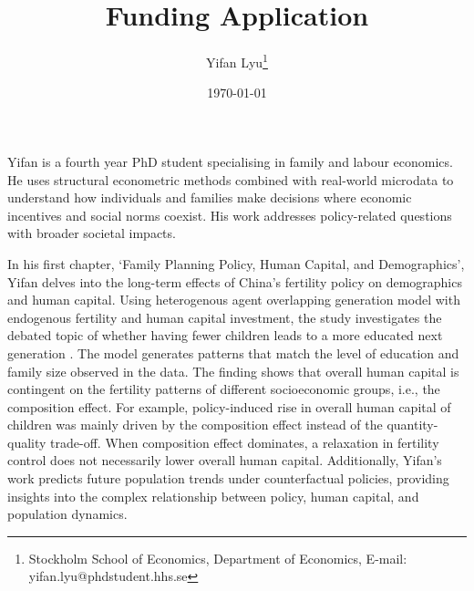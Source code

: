 \documentclass[12pt, letterpaper]{article}
\begin{document}
\providecommand{\titlename}{Funding Application}
\title{\titlename}
\author{
    {Yifan Lyu\thanks{Stockholm School of Economics, Department of Economics, E-mail: \textcolor{brickred}{yifan.lyu@phdstudent.hhs.se}}
    }
}
\date{\monthyeardate\today}
\maketitle %

\vspace{-0.5cm}


Yifan is a fourth year PhD student specialising in family and labour economics. He uses structural econometric methods combined with real-world microdata to understand how individuals and families make decisions where economic incentives and social norms coexist. His work addresses policy-related questions with broader societal impacts.



In his first chapter, `Family Planning Policy, Human Capital, and Demographics', Yifan delves into the long-term effects of China's fertility policy on demographics and human capital. Using heterogenous agent overlapping generation model with endogenous fertility and human capital investment, the study investigates the debated topic of whether having fewer children leads to a more educated next generation \citep{Zhang2017}. The model generates patterns that match the level of education and family size observed in the data. The finding shows that overall human capital is contingent on the fertility patterns of different socioeconomic groups, i.e., the composition effect. For example, policy-induced rise in overall human capital of children was mainly driven by the composition effect instead of the quantity-quality trade-off. When composition effect dominates, a relaxation in fertility control does not necessarily lower overall human capital. Additionally, Yifan's work predicts future population trends under counterfactual policies, providing insights into the complex relationship between policy, human capital, and population dynamics.
\end{document}
